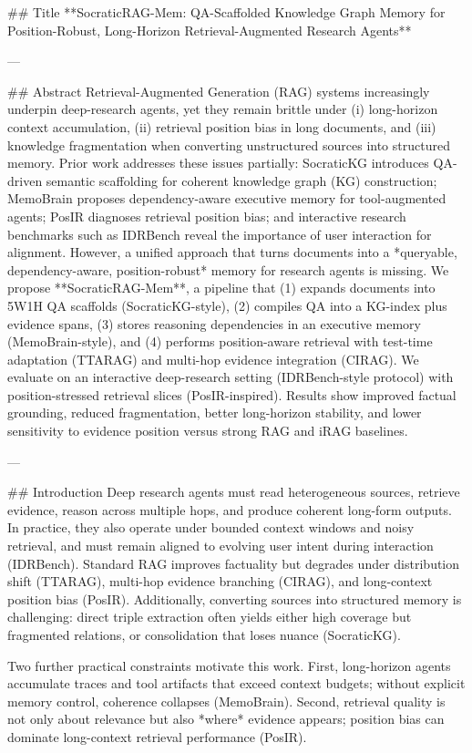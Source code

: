 ## Title  
**SocraticRAG-Mem: QA-Scaffolded Knowledge Graph Memory for Position-Robust, Long-Horizon Retrieval-Augmented Research Agents**

---

## Abstract  
Retrieval-Augmented Generation (RAG) systems increasingly underpin deep-research agents, yet they remain brittle under (i) long-horizon context accumulation, (ii) retrieval position bias in long documents, and (iii) knowledge fragmentation when converting unstructured sources into structured memory. Prior work addresses these issues partially: SocraticKG introduces QA-driven semantic scaffolding for coherent knowledge graph (KG) construction; MemoBrain proposes dependency-aware executive memory for tool-augmented agents; PosIR diagnoses retrieval position bias; and interactive research benchmarks such as IDRBench reveal the importance of user interaction for alignment. However, a unified approach that turns documents into a *queryable, dependency-aware, position-robust* memory for research agents is missing.  
We propose **SocraticRAG-Mem**, a pipeline that (1) expands documents into 5W1H QA scaffolds (SocraticKG-style), (2) compiles QA into a KG-index plus evidence spans, (3) stores reasoning dependencies in an executive memory (MemoBrain-style), and (4) performs position-aware retrieval with test-time adaptation (TTARAG) and multi-hop evidence integration (CIRAG). We evaluate on an interactive deep-research setting (IDRBench-style protocol) with position-stressed retrieval slices (PosIR-inspired). Results show improved factual grounding, reduced fragmentation, better long-horizon stability, and lower sensitivity to evidence position versus strong RAG and iRAG baselines.

---

## Introduction  
Deep research agents must read heterogeneous sources, retrieve evidence, reason across multiple hops, and produce coherent long-form outputs. In practice, they also operate under bounded context windows and noisy retrieval, and must remain aligned to evolving user intent during interaction (IDRBench). Standard RAG improves factuality but degrades under distribution shift (TTARAG), multi-hop evidence branching (CIRAG), and long-context position bias (PosIR). Additionally, converting sources into structured memory is challenging: direct triple extraction often yields either high coverage but fragmented relations, or consolidation that loses nuance (SocraticKG).

Two further practical constraints motivate this work. First, long-horizon agents accumulate traces and tool artifacts that exceed context budgets; without explicit memory control, coherence collapses (MemoBrain). Second, retrieval quality is not only about relevance but also *where* evidence appears; position bias can dominate long-context retrieval performance (PosIR).  

